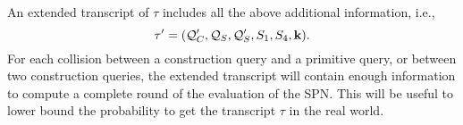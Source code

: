 An extended transcript of $\tau$ includes all the above additional information, i.e.,
%
$$\tau'=(\mathcal{Q}_{C}',\mathcal{Q}_{S},\mathcal{Q}_{S}',S_1,S_4,\mathbf{k}).$$
%
For each collision between a construction query and a primitive query, or between two construction queries, the extended transcript will contain enough information to compute a complete round of the evaluation of the SPN. This will be useful to lower bound the probability to get the transcript $\tau$ in the real world.
















